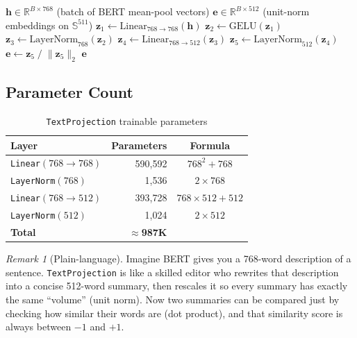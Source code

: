 \documentclass[12pt,a4paper]{article}
\theoremstyle{definition}
\theoremstyle{remark}
\newtheorem{remark}[theorem]{Remark}
\begin{document}
\begin{algorithm}[H]
\caption{\texttt{TextProjection.forward}($\mathbf{h}$)}
\label{alg:textproj}
\begin{algorithmic}[1]
\Require $\mathbf{h} \in \mathbb{R}^{B \times 768}$ (batch of BERT mean-pool vectors)
\Ensure $\mathbf{e} \in \mathbb{R}^{B \times 512}$ (unit-norm embeddings on $\mathbb{S}^{511}$)
\State $\mathbf{z}_1 \gets \text{Linear}_{768 \to 768}(\mathbf{h})$
\State $\mathbf{z}_2 \gets \text{GELU}(\mathbf{z}_1)$
\State $\mathbf{z}_3 \gets \text{LayerNorm}_{768}(\mathbf{z}_2)$
\State $\mathbf{z}_4 \gets \text{Linear}_{768 \to 512}(\mathbf{z}_3)$
\State $\mathbf{z}_5 \gets \text{LayerNorm}_{512}(\mathbf{z}_4)$
\State $\mathbf{e} \gets \mathbf{z}_5 \;/\; \|\mathbf{z}_5\|_2$
\State \Return $\mathbf{e}$
\end{algorithmic}
\end{algorithm}

\subsection{Parameter Count}

\begin{table}[H]
\centering
\caption{\texttt{TextProjection} trainable parameters}
\begin{tabular}{lrc}
\toprule
Layer & Parameters & Formula \\
\midrule
\texttt{Linear}$(768 \to 768)$ & 590,592 & $768^2 + 768$ \\
\texttt{LayerNorm}$(768)$       & 1,536   & $2 \times 768$ \\
\texttt{Linear}$(768 \to 512)$ & 393,728 & $768 \times 512 + 512$ \\
\texttt{LayerNorm}$(512)$       & 1,024   & $2 \times 512$ \\
\midrule
\textbf{Total} & \textbf{$\approx$987K} & \\
\bottomrule
\end{tabular}
\end{table}

\begin{remark}[Plain-language]
Imagine BERT gives you a 768-word description of a sentence.
\texttt{TextProjection} is like a skilled editor who rewrites that description
into a concise 512-word summary, then rescales it so every summary has exactly
the same ``volume'' (unit norm).
Now two summaries can be compared just by checking how similar their words are
(dot product), and that similarity score is always between $-1$ and $+1$.
\end{remark}
\end{document}
